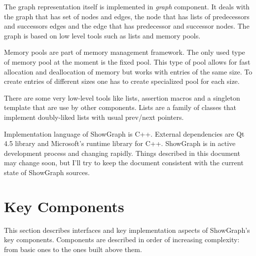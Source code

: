 \documentclass[11pt,twoside,a4paper]{article}
\begin{document}
The graph representation itself is implemented in \emph{graph} component. It deals with the graph that has set of nodes and edges, the node that has lists of predecessors and successors edges and the edge that has predecessor and successor nodes. The graph is based on low level tools such as lists and memory pools.

Memory pools are part of memory management framework. The only used type of memory pool at the moment is the fixed pool. This type of pool allows for fast allocation and deallocation of memory but works with entries of the same size. To create entries of different sizes one has to create specialized pool for each size.

There are some very low-level tools like lists, assertion macros and a singleton template that are use by other components. Lists are a family of classes that implement doubly-liked lists with usual prev/next pointers. 

Implementation language of ShowGraph is C++. External dependencies are Qt 4.5 library and Microsoft's runtime library for C++. ShowGraph is in active development process and changing rapidly. Things described in this document may change soon, but I'll try to keep the document consistent with the current state of ShowGraph sources.

\section{Key Components}
This section describes interfaces and key implementation aspects of ShowGraph's key components. Components are described in order of increasing complexity: from basic ones to the ones built above them.
\end{document}
